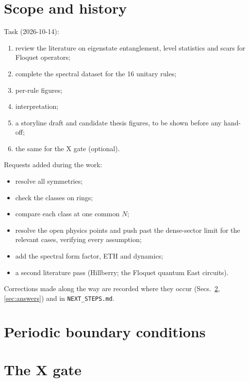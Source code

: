 \documentclass[11pt]{article}
\newcommand{\fn}[1]{\texttt{#1}}
\begin{document}
\section{Scope and history}
\label{sec:scope}
Task (2026-10-14):
\begin{enumerate}
\item review the literature on eigenstate entanglement, level statistics and scars for Floquet operators;
\item complete the spectral dataset for the 16 unitary rules;
\item per-rule figures;
\item interpretation;
\item a storyline draft and candidate thesis figures, to be shown before any hand-off;
\item the same for the X gate (optional).
\end{enumerate}
Requests added during the work:
\begin{itemize}
\item resolve all symmetries;
\item check the classes on rings;
\item compare each class at one common $N$;
\item resolve the open physics points and push past the dense-sector limit for the relevant cases, verifying every
  assumption;
\item add the spectral form factor, ETH and dynamics;
\item a second literature pass (Hillberry; the Floquet quantum East circuits).
\end{itemize}
Corrections made along the way are recorded where they occur (Secs.~\ref{sec:pbc}, \ref{sec:answers}) and in
\fn{NEXT\_STEPS.md}.






\section{Periodic boundary conditions}
\label{sec:pbc}


\section{The X gate}
\label{sec:x}





\end{document}
